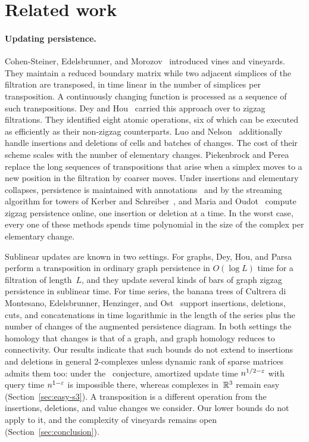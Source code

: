 \section{Related work}\label{sec:related}

\paragraph{Updating persistence.}
Cohen-Steiner, Edelsbrunner, and Morozov~\cite{CEMS06} introduced vines and vineyards.
They maintain a reduced boundary matrix while two adjacent simplices of the filtration are transposed, in time linear in the number of simplices per transposition.
A continuously changing function is processed as a sequence of such transpositions.
Dey and Hou~\cite{DH21u} carried this approach over to zigzag filtrations.
They identified eight atomic operations, six of which can be executed as efficiently as their non-zigzag counterparts.
Luo and Nelson~\cite{LN21} additionally handle insertions and deletions of cells and batches of changes.
The cost of their scheme scales with the number of elementary changes.
Piekenbrock and Perea~\cite{PP24} replace the long sequences of transpositions that arise when a simplex moves to a new position in the filtration by coarser moves.
Under insertions and elementary collapses, persistence is maintained with annotations~\cite{BCCDW12,DFW14} and by the streaming algorithm for towers of Kerber and Schreiber~\cite{KS19}, and Maria and Oudot~\cite{MO15} compute zigzag persistence online, one insertion or deletion at a time.
In the worst case, every one of these methods spends time polynomial in the size of the complex per elementary change.

Sublinear updates are known in two settings.
For graphs, Dey, Hou, and Parsa~\cite{DHP23} perform a transposition in ordinary graph persistence in $O(\log L)$ time for a filtration of length~$L$, and they update several kinds of bars of graph zigzag persistence in sublinear time.
For time series, the banana trees of Cultrera di Montesano, Edelsbrunner, Henzinger, and Ost~\cite{CEHO24} support insertions, deletions, cuts, and concatenations in time logarithmic in the length of the series plus the number of changes of the augmented persistence diagram.
In both settings the homology that changes is that of a graph, and graph homology reduces to connectivity.
Our results indicate that such bounds do not extend to insertions and deletions in general $2$-complexes unless dynamic rank of sparse matrices admits them too: under the \OMv\ conjecture, amortized update time $n^{1/2-\varepsilon}$ with query time $n^{1-\varepsilon}$ is impossible there, whereas complexes in~$\mathbb{R}^3$ remain easy (Section~\ref{sec:easy-s3}).
A transposition is a different operation from the insertions, deletions, and value changes we consider.
Our lower bounds do not apply to it, and the complexity of vineyards remains open (Section~\ref{sec:conclusion}).

